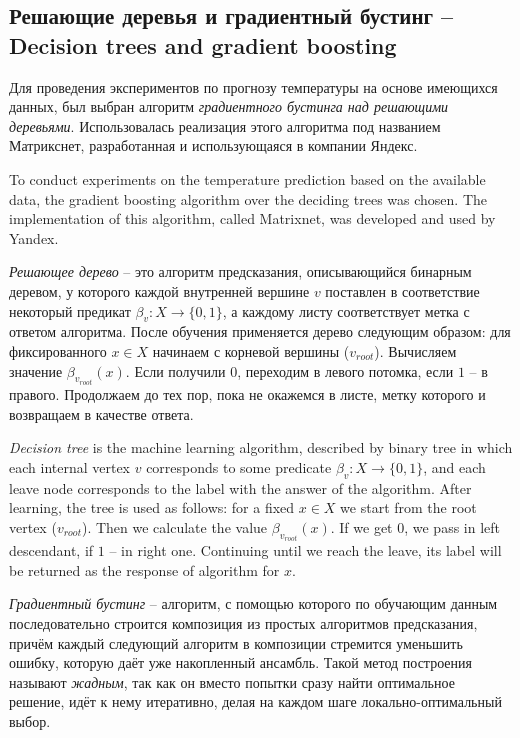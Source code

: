 \documentclass[14pt]{matmex-diploma}
\begin{document}
\subsection{Решающие деревья и градиентный бустинг -- Decision trees and gradient boosting}

Для проведения экспериментов по прогнозу температуры на основе имеющихся данных, был выбран алгоритм \textit{градиентного бустинга над решающими деревьями}. Использовалась реализация этого алгоритма под названием Матрикснет, разработанная и использующаяся в компании Яндекс.

To conduct experiments on the temperature prediction based on the available data, the gradient boosting algorithm over the deciding trees was chosen. The implementation of this algorithm, called Matrixnet, was developed and used by Yandex.

\textit{Решающее дерево} -- это алгоритм предсказания, описывающийся бинарным деревом, у которого каждой внутренней вершине $v$ поставлен в соответствие некоторый предикат $\beta_v: X \to \{0, 1\}$, а каждому листу соответствует метка с ответом алгоритма\cite{bishop}. После обучения применяется дерево следующим образом: для фиксированного $x \in X$ начинаем с корневой вершины ($v_{root}$). Вычисляем значение $\beta_{v_{root}}(x)$. Если получили $0$, переходим в левого потомка, если $1$ -- в правого. Продолжаем до тех пор, пока не окажемся в листе, метку которого и возвращаем в качестве ответа.

\textit{Decision tree} is the machine learning algorithm, described by binary tree in which each internal vertex $v$ corresponds to some predicate $\beta_v: X \to \{0, 1\}$, and each leave node corresponds to the label with the answer of the algorithm\cite{bishop}. After learning, the tree is used as follows: for a fixed $x \in X$ we start from the root vertex ($v_{root}$). Then we calculate the value $\beta_{v_{root}} (x)$. If we get $0$, we pass in left descendant, if $1$ -- in right one. Continuing until we reach the leave, its label will be returned as the response of algorithm for $x$.

\textit{Градиентный бустинг} -- алгоритм, с помощью которого по обучающим данным последовательно строится композиция из простых алгоритмов предсказания, причём каждый следующий алгоритм в композиции стремится уменьшить ошибку, которую даёт уже накопленный ансамбль. Такой метод построения называют \textit{жадным}, так как он вместо попытки сразу найти оптимальное решение, идёт к нему итеративно, делая на каждом шаге локально-оптимальный выбор\cite{friedman2001greedy}.
\end{document}
